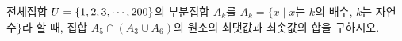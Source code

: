 전체집합 $U=\{1{,}\mkern3mu\mathopen{}2{,}\mkern3mu\mathopen{}3{,}\mkern3mu\mathopen{}\cdots{,}\mkern3mu\mathopen{}200\}$의 부분집합 $A_k$를 $A_k=\{x \mid x$는 $k$의 배수, $k$는 자연수$\}$라 할 때, 집합 $A_5\cap(A_3\cup A_6)$의 원소의 최댓값과 최솟값의 합을 구하시오.

